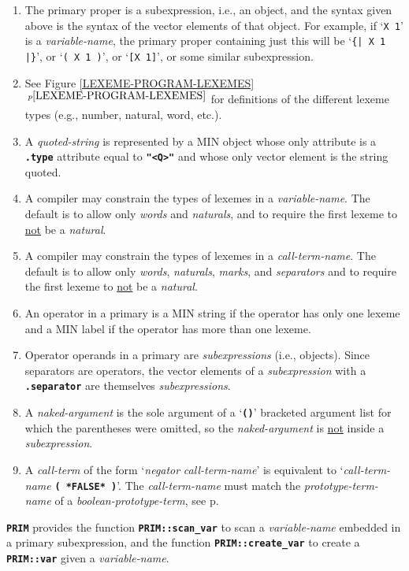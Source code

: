 \documentclass[12pt]{article}
\newcommand{\TT}[1]{{\tt \bfseries #1}}
\newcommand{\itemref}[1]{\ref{#1}$\,^{p\pageref{#1}}$}
\newcommand{\pagref}[1]{p\pageref{#1}}
\newenvironment{indpar}[1][0.3in]%
	{\begin{list}{}%
		     {\setlength{\itemsep}{0in}%
		      \setlength{\topsep}{0in}%
		      \setlength{\parsep}{1ex}%
		      \setlength{\labelwidth}{#1}%
		      \setlength{\leftmargin}{#1}%
		      \addtolength{\leftmargin}{\labelsep}}%
	 \item}%
	{\end{list}}
\begin{document}
\begin{indpar}
\begin{enumerate}
\item The primary proper is a subexpression, i.e., an object,
and the syntax given above is the syntax of the vector elements
of that object.  For example, if `{\tt X 1}' is a {\em variable-name},
the primary proper containing just this will be `{\tt \{| X 1 |\}}',
or `{\tt ( X 1 )}', or `{\tt [X 1]}', or some similar subexpression.
\item See Figure \itemref{LEXEME-PROGRAM-LEXEMES} for definitions of the
different lexeme types (e.g., number, natural, word, etc.).
\item
A {\em quoted-string} is represented by a MIN object
whose only attribute is a \TT{.type} attribute equal to \TT{"<Q>"} and
whose only vector element is the string quoted.
\item
A compiler may constrain the types of lexemes in a {\em variable-name}.
The default is to allow only {\em words} and {\em naturals},
and to require the first lexeme to \underline{not} be a {\em natural}.
\item
A compiler may constrain the types of lexemes in a {\em call-term-name}.
The default is to allow only {\em words}, {\em naturals}, {\em marks},
and {\em separators}
and to require the first lexeme to \underline{not} be a {\em natural}.
\item
An operator in a primary is a MIN string if the operator has only one
lexeme and a MIN label if the operator has more than one lexeme.
\item
Operator operands in a primary are {\em subexpressions} (i.e., objects).
Since separators are operators, the vector elements of a {\em subexpression}
with a \TT{.separator} are themselves {\em subexpressions}.
\item
A {\em naked-argument} is the sole argument of a `\TT{()}' bracketed
argument list for which the parentheses were omitted, so the
{\em naked-argument} is \underline{not} inside a {\em subexpression}.
\item
A {\em call-term} of the form `{\em negator} {\em call-term-name}'
is equivalent to `{\em call-term-name} \TT{( *FALSE* )}'.
The {\em call-term-name} must match the {\em prototype-term-name}
of a {\em boolean-prototype-term},
see \pagref{BOOLEAN-PROTOTYPE-TERM}.


\end{enumerate}

\end{indpar}

\TT{PRIM} provides the function \TT{PRIM::scan\_var} to scan
a {\em variable-name} embedded in a primary subexpression,
and the function \TT{PRIM::create\_var} to create a \TT{PRIM::var}
given a {\em variable-name}.
\end{document}

